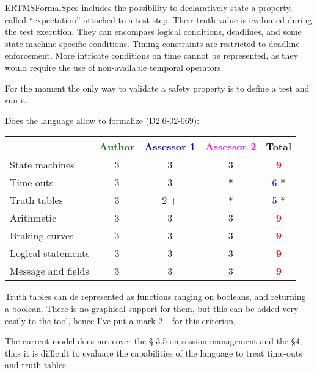 \begin{assessor1}
ERTMSFormalSpec includes the possibility to declaratively state a property, called "`expectation"' attached to a test step. Their truth value is evaluated during the test execution. They can encompass logical conditions, deadlines, and some state-machine specific conditions. 
Timing constraints are restricted to deadline enforcement. More intricate conditions on time cannot be represented, as they would require the use of non-available temporal operators. 
\end{assessor1}


\begin{assessor2}
For the moment the only way to validate a safety property is to define a test and run it.
\end{assessor2}

Does the language allow to  formalize (D2.6-02-069):

\begin{tabular}{|l | c | c | c | c|}
\hline
& \textcolor{green}{Author} & \textcolor{blue}{Assessor 1} & \textcolor{magenta}{Assessor 2} & Total \\
\hline 
State machines  & 3    & 3    & 3    & \textcolor{red}{\textbf{9}} \\
\hline
Time-outs  & 3    & 3    & * & \textcolor{blue}{6} *  \\
\hline
Truth tables  & 3    & 2   + & * & \textcolor{blue}{5} *  \\
\hline
Arithmetic  & 3    & 3    & 3    & \textcolor{red}{\textbf{9}}  \\
\hline
Braking curves  & 3    & 3    & 3    & \textcolor{red}{\textbf{9}} \\
\hline
Logical statements & 3    & 3    & 3    & \textcolor{red}{\textbf{9}}  \\
\hline
Message and fields & 3    & 3    & 3    & \textcolor{red}{\textbf{9}} \\
\hline
\end{tabular}

\begin{assessor1}
Truth tables can de represented as functions ranging on booleans, and returning a boolean. There is no graphical support for them, but this can be added very easily to the tool, hence I've put a mark 2+ for this criterion. 
\end{assessor1}


\begin{assessor2}
The current model does not cover the §  3.5 on session management and the §4, thus it is difficult to evaluate the capabilities of the language to treat time-outs and truth tables.
\end{assessor2}


